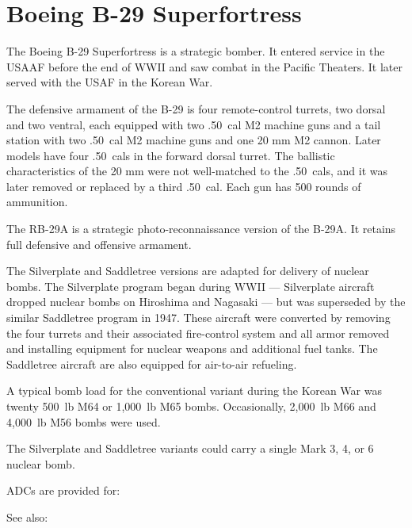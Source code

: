 \section{Boeing B-29 Superfortress}

The Boeing B-29 Superfortress is a strategic bomber. It entered service in the USAAF before the end of WWII and saw combat in the Pacific Theaters. It later served with the USAF in the Korean War.

The defensive armament of the B-29 is four remote-control turrets, two dorsal and two ventral, each equipped with two .50~cal M2 machine guns and a tail station with two .50~cal M2 machine guns and one 20 mm M2 cannon. Later models have four .50~cals in the forward dorsal turret. The ballistic characteristics of the 20 mm were not well-matched to the .50~cals, and it was later removed or replaced by a third .50~cal. Each gun has 500 rounds of ammunition.

The RB-29A is a strategic photo-reconnaissance version of the B-29A. It retains full defensive and offensive armament.

The Silverplate and Saddletree versions are adapted for delivery of nuclear bombs.  The Silverplate program began during WWII --- Silverplate aircraft dropped nuclear bombs on Hiroshima and Nagasaki --- but was superseded by the similar Saddletree program in 1947. These aircraft were converted by removing the four turrets and their associated fire-control system and all armor removed and installing equipment for nuclear weapons and additional fuel tanks. The Saddletree aircraft are also equipped for air-to-air refueling.

A typical bomb load for the conventional variant during the Korean War was twenty 500~lb M64 or 1,000~lb M65 bombs. Occasionally, 2,000~lb M66 and 4,000~lb M56 bombs were used.

The Silverplate and Saddletree variants could carry a single Mark 3, 4, or 6 nuclear bomb.

ADCs are provided for:
\begin{adclist}
\end{adclist}

See also:
\begin{typelist}
\end{typelist}